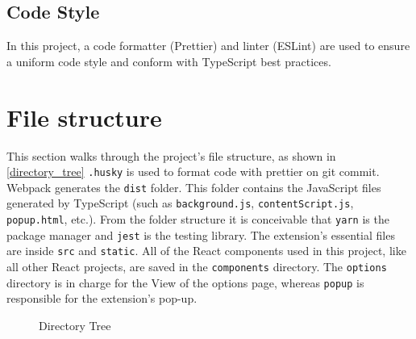 \subsection{Code Style}
In this project, a code formatter (Prettier) and linter (ESLint) are used to ensure a uniform code style and conform with TypeScript best practices.

\section{File structure}
This section walks through the project's file structure, as shown in \autoref{directory_tree} \texttt{.husky} is used to format code with prettier on git commit. Webpack generates the \texttt{dist} folder. This folder contains the JavaScript files generated by TypeScript (such as \texttt{background.js}, \texttt{contentScript.js}, \texttt{popup.html}, etc.). From the folder structure it is conceivable that \texttt{yarn} is the package manager and \texttt{jest} is the testing library. The extension's essential files are inside \texttt{src} and \texttt{static}. All of the React components used in this project, like all other React projects, are saved in the \texttt{components} directory. The \texttt{options} directory is in charge for the View of the options page, whereas \texttt{popup} is responsible for the extension's pop-up.

\begin{figure}[H]
  \caption{Directory Tree}
  \label{directory_tree}
\end{figure}

